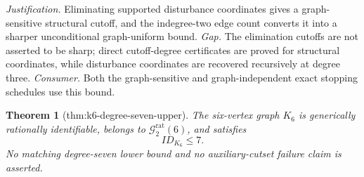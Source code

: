 \documentclass{article}
\newtheorem{theorem}{Theorem}
\begin{document}
\par\smallskip\noindent \textit{Justification.} Eliminating supported disturbance coordinates gives a graph-sensitive structural cutoff, and the indegree-two edge count converts it into a sharper unconditional graph-uniform bound. \textit{Gap.} The elimination cutoffs are not asserted to be sharp; direct cutoff-degree certificates are proved for structural coordinates, while disturbance coordinates are recovered recursively at degree three. \textit{Consumer.} Both the graph-sensitive and graph-independent exact stopping schedules use this bound.

\begin{theorem}[thm:k6-degree-seven-upper]\label{thm:k6-degree-seven-upper}
The six-vertex graph \(K_6\) is generically rationally identifiable, belongs to \(\mathcal G_{2}^{\mathrm{rat}}(6)\), and satisfies
\[
 ID_{K_6}\leq7.
\]
No matching degree-seven lower bound and no auxiliary-cutset failure claim is asserted.
\end{theorem}
\end{document}
